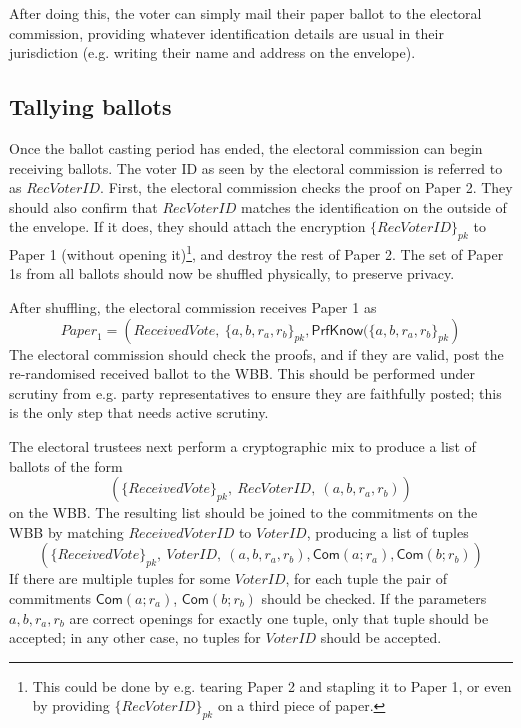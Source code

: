 \documentclass[12pt,a4paper]{article}
\newcommand{\commit}{\mathsf{Com}}
\newcommand{\PrfKnow}{\mathsf{PrfKnow}}
\theoremstyle{definition}
\newcommand{\VoterID}{\mathit{VoterID}}
\newcommand{\receivedvid}{\mathit{RecVoterID}}
\newcommand{\Paper}{\mathit{Paper}}
\begin{document}
After doing this, the voter can simply mail their paper ballot to the electoral commission, providing whatever identification details are usual in their jurisdiction (e.g. writing their name and address on the envelope).
\subsection{Tallying ballots}
Once the ballot casting period has ended, the electoral commission can begin receiving ballots. The voter ID as seen by the electoral commission is referred to as $\receivedvid$. First, the electoral commission checks the proof on Paper 2. 
They should also confirm that $\receivedvid$ matches the identification on the outside of the envelope. If it does, they should attach the encryption $\{\receivedvid\}_{pk}$ to Paper 1 (without opening it)\footnote{This could be done by e.g. tearing Paper 2 and stapling it to Paper 1, or even by providing $\{\receivedvid\}_{pk}$ on a third piece of paper.}, and destroy the rest of Paper 2. The set of Paper 1s from all ballots should now be shuffled physically, to preserve privacy.

After shuffling, the electoral commission receives Paper 1 as
$$\Paper_1=\left(ReceivedVote,\ \{a,b,r_a,r_b\}_{pk}, \PrfKnow(\{a,b,r_a,r_b\}_{pk}\right)$$
The electoral commission should check the proofs, and if they are valid, post the re-randomised received ballot to the WBB. This should be performed under scrutiny from e.g. party representatives to ensure they are faithfully posted; this is the only step that needs active scrutiny.

The electoral trustees next perform a cryptographic mix to produce a list of ballots of the form
$$\left(\{ReceivedVote\}_{pk},\ \receivedvid,\ (a,b,r_a,r_b)\right)$$
on the WBB. The resulting list should be joined to the commitments on the WBB by matching $ReceivedVoterID$ to $\VoterID$, producing a list of tuples
$$\left(\{ReceivedVote\}_{pk},\ \VoterID,\ (a,b,r_a,r_b), \commit(a;r_a), \commit(b;r_b)\right)$$
If there are multiple tuples for some $\VoterID$, for each tuple the pair of commitments $\commit(a;r_a)$, $\commit(b;r_b)$ should be checked. If the parameters $a,b,r_a,r_b$ are correct openings for exactly one tuple, only that tuple should be accepted; in any other case, no tuples for $\VoterID$ should be accepted.
\end{document}
